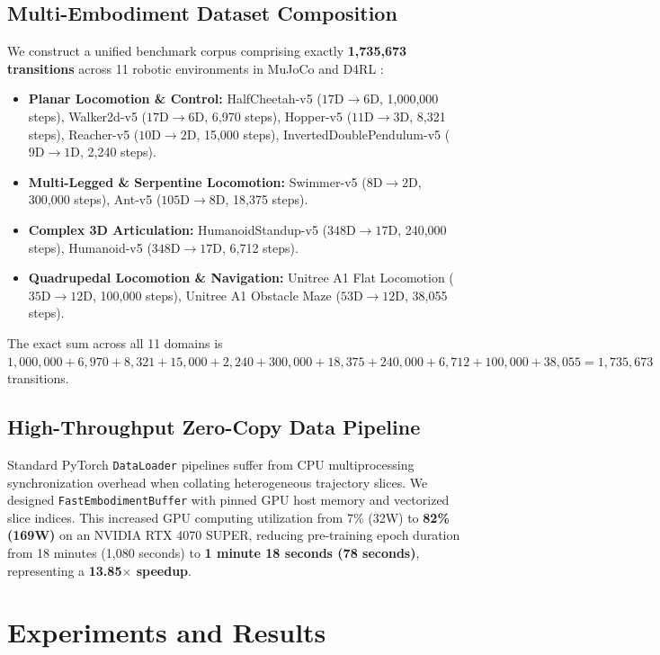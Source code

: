 \documentclass{article}
\begin{document}
\subsection{Multi-Embodiment Dataset Composition}
We construct a unified benchmark corpus comprising exactly \textbf{1,735,673 transitions} across 11 robotic environments in MuJoCo \cite{todorov2012mujoco} and D4RL \cite{fu2020d4rl}:
\begin{itemize}
    \item \textbf{Planar Locomotion \& Control:} HalfCheetah-v5 ($17\text{D} \to 6\text{D}$, 1,000,000 steps), Walker2d-v5 ($17\text{D} \to 6\text{D}$, 6,970 steps), Hopper-v5 ($11\text{D} \to 3\text{D}$, 8,321 steps), Reacher-v5 ($10\text{D} \to 2\text{D}$, 15,000 steps), InvertedDoublePendulum-v5 ($9\text{D} \to 1\text{D}$, 2,240 steps).
    \item \textbf{Multi-Legged \& Serpentine Locomotion:} Swimmer-v5 ($8\text{D} \to 2\text{D}$, 300,000 steps), Ant-v5 ($105\text{D} \to 8\text{D}$, 18,375 steps).
    \item \textbf{Complex 3D Articulation:} HumanoidStandup-v5 ($348\text{D} \to 17\text{D}$, 240,000 steps), Humanoid-v5 ($348\text{D} \to 17\text{D}$, 6,712 steps).
    \item \textbf{Quadrupedal Locomotion \& Navigation:} Unitree A1 Flat Locomotion ($35\text{D} \to 12\text{D}$, 100,000 steps), Unitree A1 Obstacle Maze ($53\text{D} \to 12\text{D}$, 38,055 steps).
\end{itemize}
The exact sum across all 11 domains is $1{,}000{,}000 + 6{,}970 + 8{,}321 + 15{,}000 + 2{,}240 + 300{,}000 + 18{,}375 + 240{,}000 + 6{,}712 + 100{,}000 + 38{,}055 = 1{,}735{,}673$ transitions.

\subsection{High-Throughput Zero-Copy Data Pipeline}
Standard PyTorch \texttt{DataLoader} pipelines suffer from CPU multiprocessing synchronization overhead when collating heterogeneous trajectory slices. We designed \texttt{FastEmbodimentBuffer} with pinned GPU host memory and vectorized slice indices. This increased GPU computing utilization from 7\% (32W) to \textbf{82\% (169W)} on an NVIDIA RTX 4070 SUPER, reducing pre-training epoch duration from 18 minutes (1,080 seconds) to \textbf{1 minute 18 seconds (78 seconds)}, representing a \textbf{13.85$\times$ speedup}.

\section{Experiments and Results}
\label{sec:experiments}
\end{document}
